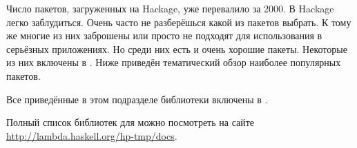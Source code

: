\newpage {}

Число пакетов, загруженных на Hackage, уже перевалило за 2000. В Hackage
легко заблудиться. Очень часто не разберёшься какой из пакетов выбрать.
К тому же многие из них заброшены или просто не подходят для
использования в серьёзных приложениях. Но среди них есть и очень хорошие
пакеты. Некоторые из них включены в . Ниже приведён
тематический обзор наиболее популярных пакетов.


Все приведённые в этом подразделе библиотеки включены в
.

Полный список библиотек для  можно посмотреть на
сайте \url{http://lambda.haskell.org/hp-tmp/docs}.

